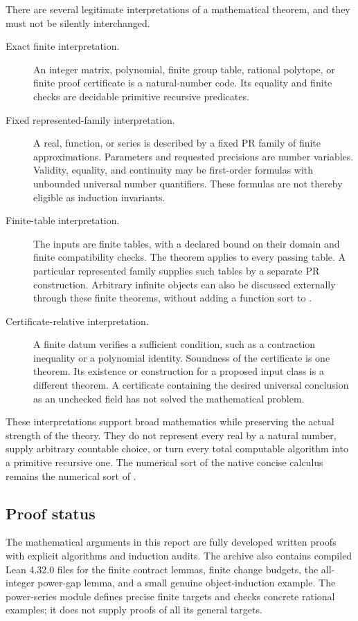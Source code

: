 There are several legitimate interpretations of a mathematical theorem,
and they must not be silently interchanged.
\begin{description}
\item[Exact finite interpretation.]
An integer matrix, polynomial, finite group table, rational polytope, or
finite proof certificate is a natural-number code.  Its equality and
finite checks are decidable primitive recursive predicates.
\item[Fixed represented-family interpretation.]
A real, function, or series is described by a fixed PR family of finite
approximations.  Parameters and requested precisions are number variables.
Validity, equality, and continuity may be first-order formulas with
unbounded universal number quantifiers.  These formulas are not thereby
eligible as induction invariants.
\item[Finite-table interpretation.]
The inputs are finite tables, with a declared bound on their domain and
finite compatibility checks.  The theorem applies to every passing table.
A particular represented family supplies such tables by a separate PR
construction.  Arbitrary infinite objects can also be discussed externally
through these finite theorems, without adding a function sort to \ipra.
\item[Certificate-relative interpretation.]
A finite datum verifies a sufficient condition, such as a contraction
inequality or a polynomial identity.  Soundness of the certificate is one
theorem.  Its existence or construction for a proposed input class is a
different theorem.  A certificate containing the desired universal
conclusion as an unchecked field has not solved the mathematical problem.
\end{description}

These interpretations support broad mathematics while preserving the
actual strength of the theory.  They do not represent every real by a
natural number, supply arbitrary countable choice, or turn every total
computable algorithm into a primitive recursive one.  The numerical sort
of the native concise calculus remains the numerical sort of \ipra.

\subsection{Proof status}

The mathematical arguments in this report are fully developed written
proofs with explicit algorithms and induction audits.  The archive also
contains compiled Lean 4.32.0 files for the finite contract lemmas, finite
change budgets, the all-integer power-gap lemma, and a small genuine
object-\ipra induction example.  The power-series module defines precise
finite targets and checks concrete rational examples; it does not supply
proofs of all its general targets.


